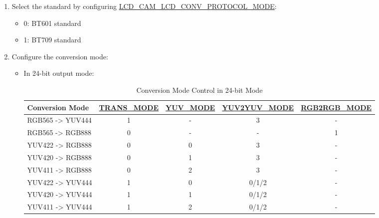 \documentclass[main\_\_EN.tex]{subfiles}
\begin{document}
\begin{enumerate}
    \item Select the standard by configuring \hyperref[fielddesc:LCDCAMLCDCONVPROTOCOLMODE]{LCD\_CAM\_LCD\_CONV\_PROTOCOL\_MODE}:
    \begin{itemize}
        \item 0: BT601 standard
        \item 1: BT709 standard
    \end{itemize}
    \item Configure the conversion mode:
    \begin{itemize}
        \item In 24-bit output mode:
                      \begin{table}[H]
                \caption{Conversion Mode Control in 24-bit Mode}
                \centering
                \begin{threeparttable}
                \begin{tabular}{|l|c|c|c|c|}
                \hline
                \rowcolor{lightgray}
                \textbf{Conversion Mode} & \textbf{\hyperref[fielddesc:LCDCAMLCDCONVTRANSMODE]{TRANS\_MODE}}\tnote{1} & \textbf{\hyperref[fielddesc:LCDCAMLCDCONVYUVMODE]{YUV\_MODE}}\tnote{2} & \textbf{\hyperref[fielddesc:LCDCAMLCDCONVYUV2YUVMODE]{YUV2YUV\_MODE}}\tnote{3} & 
                \textbf{\hyperref[fielddesc:LCDCAMLCDCONVRGB2RGBMODE]{RGB2RGB\_MODE}}\tnote{4} \\ \hline
                RGB565 -> YUV444 & 1 & - & 3 & - \\ \hline
                RGB565 -> RGB888 & 0 & - & - & 1 \\ \hline
                YUV422 -> RGB888 & 0 & 0 & 3 & - \\ \hline
                YUV420 -> RGB888 & 0 & 1 & 3 & - \\ \hline
                YUV411 -> RGB888 & 0 & 2 & 3 & - \\ \hline
                YUV422 -> YUV444 & 1 & 0 & 0/1/2 & - \\ \hline
                YUV420 -> YUV444 & 1 & 1 & 0/1/2 & - \\ \hline
                YUV411 -> YUV444 & 1 & 2 & 0/1/2 & - \\ \hline
                \end{tabular}
            
            \end{threeparttable}
            \end{table}


\end{itemize}
\end{enumerate}
\end{document}
